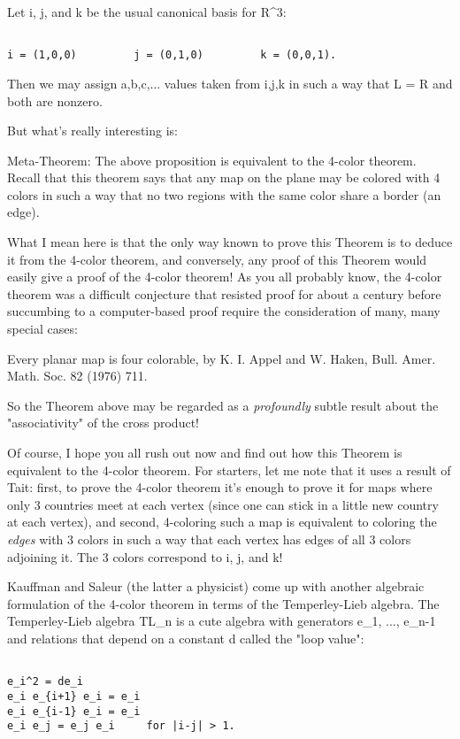 Let i, j, and k be the usual canonical basis for R^3:


\begin{verbatim}

i = (1,0,0)         j = (0,1,0)         k = (0,0,1).
\end{verbatim}
    

Then we may assign a,b,c,... values taken from {i,j,k} in such a way 
that L = R and both are nonzero.

But what's really interesting is:

Meta-Theorem: The above proposition is equivalent to the 4-color
theorem.  Recall that this theorem says that any map on the plane may be
colored with 4 colors in such a way that no two regions with the same
color share a border (an edge).  

What I mean here is that the only way known to prove this Theorem is to
deduce it from the 4-color theorem, and conversely, any proof of this
Theorem would easily give a proof of the 4-color theorem!  As you all
probably know, the 4-color theorem was a difficult conjecture that
resisted proof for about a century before succumbing to a computer-based
proof require the consideration of many, many special cases:

Every planar map is four colorable, by K. I. Appel and W. Haken, Bull.
Amer. Math. Soc. 82 (1976) 711.

So the Theorem above may be regarded as a \emph{profoundly} subtle result
about the "associativity" of the cross product!

Of course, I hope you all rush out now and find out how this Theorem is
equivalent to the 4-color theorem.  For starters, let me note that it
uses a result of Tait: first, to prove the 4-color theorem it's enough
to prove it for maps where only 3 countries meet at each vertex (since
one can stick in a little new country at each vertex), and second,
4-coloring such a map is equivalent to coloring the \emph{edges} with 3
colors in such a way that each vertex has edges of all 3 colors
adjoining it.  The 3 colors correspond to i, j, and k!

Kauffman and Saleur (the latter a physicist) come up with another algebraic
formulation of the 4-color theorem in terms of the Temperley-Lieb
algebra.  The Temperley-Lieb algebra TL_n is a cute algebra with
generators e_1, ..., e_{n-1} and relations that depend on a constant d
called the "loop value":


\begin{verbatim}

e_i^2 = de_i
e_i e_{i+1} e_i = e_i
e_i e_{i-1} e_i = e_i
e_i e_j = e_j e_i     for |i-j| > 1.
\end{verbatim}
    

